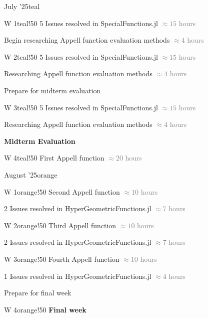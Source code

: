 \documentclass{article}
\newcommand{\release}[2]{%
        #1
        \hspace*{\fill}
        \textcolor{gray}{#2}\par}
\theoremstyle{mytheoremstyle}
\theoremstyle{mytheoremstyle}
\theoremstyle{myproblemstyle}
\begin{document}
      \begin{releaseyear}{July '25}{teal}
        \begin{releasequarter}{W 1}{teal!50}
          \release{5 Issues resolved in SpecialFunctions.jl}{$\approx 15$  hours}
          \release{Begin researching Appell function evaluation methods}{$\approx 4$  hours}
        \end{releasequarter}
        \begin{releasequarter}{W 2}{teal!50}
          \release{5 Issues resolved in SpecialFunctions.jl}{$\approx 15$  hours}
          \release{Researching Appell function evaluation methods}{$\approx 4$  hours}
          \release{Prepare for midterm evaluation}{}
        \end{releasequarter}
        \begin{releasequarter}{W 3}{teal!50}
          \release{5 Issues resolved in SpecialFunctions.jl}{$\approx 15$  hours}
          \release{Researching Appell function evaluation methods}{$\approx 4$  hours}
          \release{\textbf{Midterm Evaluation}}{}
        \end{releasequarter}
        \begin{releasequarter}{W 4}{teal!50}
          \release{First Appell function}{$\approx 20$  hours}
        \end{releasequarter}
      \end{releaseyear}
      \begin{releaseyear}{August '25}{orange}
        \begin{releasequarter}{W 1}{orange!50}
          \release{Second Appell function}{$\approx 10$  hours}
          \release{2 Issues resolved in HyperGeometricFunctions.jl}{$\approx 7$  hours}
        \end{releasequarter}
        \begin{releasequarter}{W 2}{orange!50} \release{Third Appell function}{$\approx 10$  hours}
          \release{2 Issues resolved in HyperGeometricFunctions.jl}{$\approx 7$  hours}
        \end{releasequarter}
        \begin{releasequarter}{W 3}{orange!50}
          \release{Fourth Appell function}{$\approx 10$  hours}
          \release{1 Issues resolved in HyperGeometricFunctions.jl}{$\approx 4$  hours}
          \release{Prepare for final week}{} \end{releasequarter}
        \begin{releasequarter}{W 4}{orange!50}
          \release{\textbf{Final week}}{}
        \end{releasequarter}
      \end{releaseyear}
\end{document}
